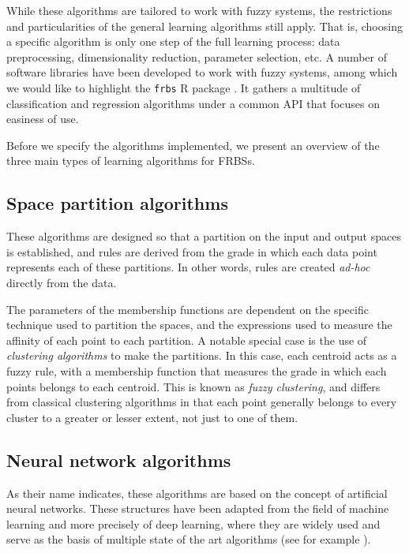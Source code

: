 While these algorithms are tailored to work with fuzzy systems, the restrictions and particularities of the general learning algorithms still apply. That is, choosing a specific algorithm is only one step of the full learning process: data preprocessing, dimensionality reduction, parameter selection, etc. A number of software libraries have been developed to work with fuzzy systems, among which we would like to highlight the \verb|frbs| R package \cite{riza2015frbs}. It gathers a multitude of classification and regression algorithms under a common API that focuses on easiness of use.

Before we specify the algorithms implemented, we present an overview of the three main types of learning algorithms for FRBSs.

\subsection{Space partition algorithms}

These algorithms are designed so that a partition on the input and output spaces is established, and rules are derived from the grade in which each data point represents each of these partitions. In other words, rules are created \textit{ad-hoc} directly from the data.

The parameters of the membership functions are dependent on the specific technique used to partition the spaces, and the expressions used to measure the affinity of each point to each partition. A notable special case is the use of \textit{clustering algorithms} to make the partitions. In this case, each centroid acts as a fuzzy rule, with a membership function that measures the grade in which each points belongs to each centroid. This is known as \textit{fuzzy clustering}, and differs from classical clustering algorithms in that each point generally belongs to every cluster to a greater or lesser extent, not just to one of them.

\subsection{Neural network algorithms}

As their name indicates, these algorithms are based on the concept of artificial neural networks. These structures have been adapted from the field of machine learning and more precisely of deep learning, where they are widely used and serve as the basis of multiple state of the art algorithms (see for example \cite{lecun2015deep}).

